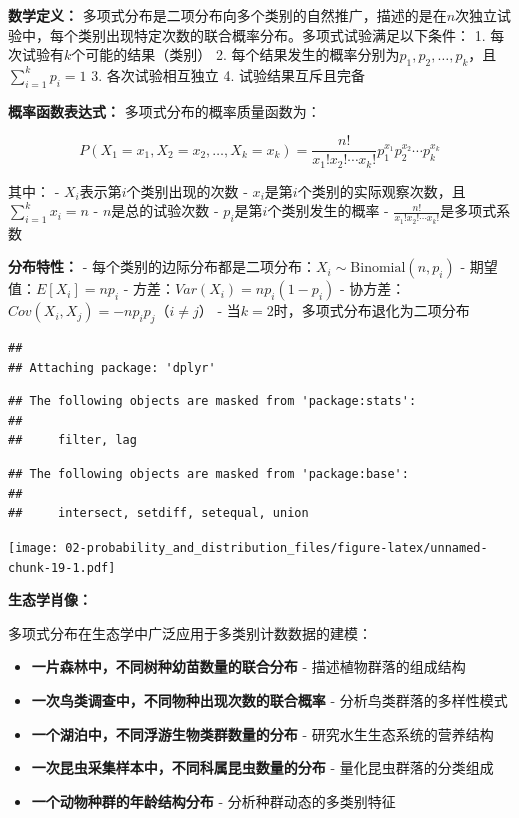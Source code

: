 \documentclass[
  twoside]{book}
\providecommand{\tightlist}{%
  \setlength{\itemsep}{0pt}\setlength{\parskip}{0pt}}
\begin{document}
\textbf{数学定义：} 多项式分布是二项分布向多个类别的自然推广，描述的是在\(n\)次独立试验中，每个类别出现特定次数的联合概率分布。多项式试验满足以下条件：
1. 每次试验有\(k\)个可能的结果（类别）
2. 每个结果发生的概率分别为\(p_1, p_2, \ldots, p_k\)，且\(\sum_{i=1}^k p_i = 1\)
3. 各次试验相互独立
4. 试验结果互斥且完备

\textbf{概率函数表达式：} 多项式分布的概率质量函数为：

\[P(X_1 = x_1, X_2 = x_2, \ldots, X_k = x_k) = \frac{n!}{x_1! x_2! \cdots x_k!} p_1^{x_1} p_2^{x_2} \cdots p_k^{x_k}\]

其中：
- \(X_i\)表示第\(i\)个类别出现的次数
- \(x_i\)是第\(i\)个类别的实际观察次数，且\(\sum_{i=1}^k x_i = n\)
- \(n\)是总的试验次数
- \(p_i\)是第\(i\)个类别发生的概率
- \(\frac{n!}{x_1! x_2! \cdots x_k!}\)是多项式系数

\textbf{分布特性：}
- 每个类别的边际分布都是二项分布：\(X_i \sim \text{Binomial}(n, p_i)\)
- 期望值：\(E[X_i] = np_i\)
- 方差：\(Var(X_i) = np_i(1-p_i)\)
- 协方差：\(Cov(X_i, X_j) = -np_i p_j\)（\(i \neq j\)）
- 当\(k=2\)时，多项式分布退化为二项分布

\begin{verbatim}
## 
## Attaching package: 'dplyr'
\end{verbatim}

\begin{verbatim}
## The following objects are masked from 'package:stats':
## 
##     filter, lag
\end{verbatim}

\begin{verbatim}
## The following objects are masked from 'package:base':
## 
##     intersect, setdiff, setequal, union
\end{verbatim}

\texttt{[image: 02-probability\_and\_distribution\_files/figure-latex/unnamed-chunk-19-1.pdf]}

\textbf{生态学肖像：}

多项式分布在生态学中广泛应用于多类别计数数据的建模：

\begin{itemize}
\tightlist
\item
  \textbf{一片森林中，不同树种幼苗数量的联合分布} - 描述植物群落的组成结构
\item
  \textbf{一次鸟类调查中，不同物种出现次数的联合概率} - 分析鸟类群落的多样性模式
\item
  \textbf{一个湖泊中，不同浮游生物类群数量的分布} - 研究水生生态系统的营养结构
\item
  \textbf{一次昆虫采集样本中，不同科属昆虫数量的分布} - 量化昆虫群落的分类组成
\item
  \textbf{一个动物种群的年龄结构分布} - 分析种群动态的多类别特征
\end{itemize}
\end{document}

